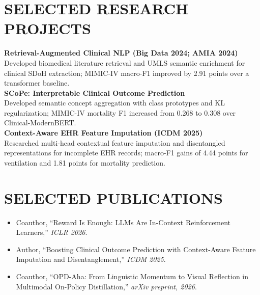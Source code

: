 \documentclass[10pt, letterpaper]{article}
\begin{document}
\section{SELECTED RESEARCH PROJECTS}
\textbf{Retrieval-Augmented Clinical NLP (Big Data 2024; AMIA 2024)}\\[-1pt]
Developed biomedical literature retrieval and UMLS semantic enrichment for clinical SDoH extraction; MIMIC-IV macro-F1 improved by 2.91 points over a transformer baseline.\\[3pt]
\textbf{SCoPe: Interpretable Clinical Outcome Prediction}\\[-1pt]
Developed semantic concept aggregation with class prototypes and KL regularization; MIMIC-IV mortality F1 increased from 0.268 to 0.308 over Clinical-ModernBERT.\\[3pt]
\textbf{Context-Aware EHR Feature Imputation (ICDM 2025)}\\[-1pt]
Researched multi-head contextual feature imputation and disentangled representations for incomplete EHR records; macro-F1 gains of 4.44 points for ventilation and 1.81 points for mortality prediction.\\[3pt]
\section{SELECTED PUBLICATIONS}
\begin{itemize}
\item Coauthor, ``Reward Is Enough: LLMs Are In-Context Reinforcement Learners,'' \textit{ICLR 2026}.
\item Author, ``Boosting Clinical Outcome Prediction with Context-Aware Feature Imputation and Disentanglement,'' \textit{ICDM 2025}.
\item Coauthor, ``OPD-Aha: From Linguistic Momentum to Visual Reflection in Multimodal On-Policy Distillation,'' \textit{arXiv preprint, 2026}.
\end{itemize}
\end{document}
